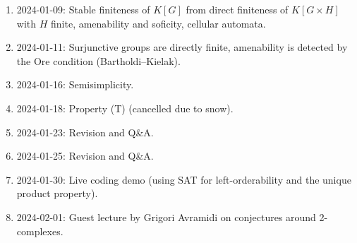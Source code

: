 \begin{enumerate}
\item
2024-01-09: Stable finiteness of $K[G]$ from direct finiteness of $K[G \times H]$ with $H$ finite, amenability and soficity, cellular automata.

\item
2024-01-11: Surjunctive groups are directly finite, amenability is detected by the Ore condition (Bartholdi--Kielak).

\item
2024-01-16: Semisimplicity.

\item
2024-01-18: Property (T) (cancelled due to snow).

\item
2024-01-23: Revision and Q\&A.

\item
2024-01-25: Revision and Q\&A.

\item
2024-01-30: Live coding demo (using SAT for left-orderability and the unique product property).

\item
2024-02-01: Guest lecture by Grigori Avramidi on conjectures around 2-complexes.
\end{enumerate}
